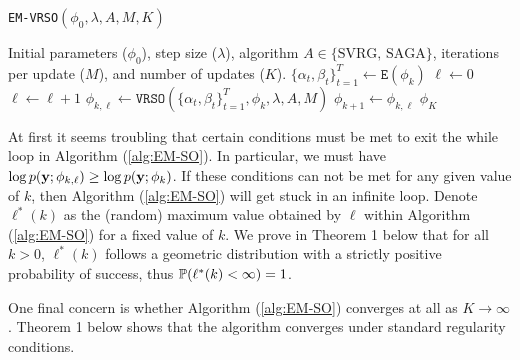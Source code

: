 \begin{algorithm}
\caption{\texttt{EM-VRSO}$(\phi_0,\lambda, A, M, K)$}\label{alg:EM-SO}
\begin{algorithmic}[1]
\Require Initial parameters ($\phi_{0}$), step size ($\lambda$), algorithm $A \in \{\text{SVRG, SAGA}\}$, iterations per update ($M$), and number of updates ($K$).
%
\vspace{5pt}
% 
\State $\{\alpha_t,\beta_t\}_{t=1}^{T} \gets \texttt{E}(\phi_{k})$ 
%
\State $\ell \gets 0$
%
%
 
\State $\ell \gets \ell+1$
\State $\phi_{k,\ell} \gets \texttt{VRSO}(\{\alpha_t,\beta_t\}_{t=1}^{T},\phi_{k},\lambda,A,M)$
%
\EndWhile
\State $\phi_{k+1} \gets \phi_{k,\ell}$
\EndFor
\State \Return $\phi_K$
\end{algorithmic}
\end{algorithm}


At first it seems troubling that certain conditions must be met to exit the while loop in Algorithm (\ref{alg:EM-SO}). In particular, we must have $\log p(\mathbf{y};\phi_{k,\ell}) \geq \log p(\mathbf{y};\phi_{k})$. %
If these conditions can not be met for any given value of $k$, then Algorithm (\ref{alg:EM-SO}) will get stuck in an infinite loop. Denote $\ell^*(k)$ as the (random) maximum value obtained by $\ell$ within Algorithm (\ref{alg:EM-SO}) for a fixed value of $k$. We prove in Theorem 1 below that for all $k > 0$, $\ell^*(k)$ follows a geometric distribution with a strictly positive probability of success, thus $\mathbb{P}(\ell^*(k) < \infty) = 1$. %

One final concern is whether Algorithm (\ref{alg:EM-SO}) converges at all as $K \to \infty$. %
Theorem 1 below shows that the algorithm converges under standard regularity conditions. %

